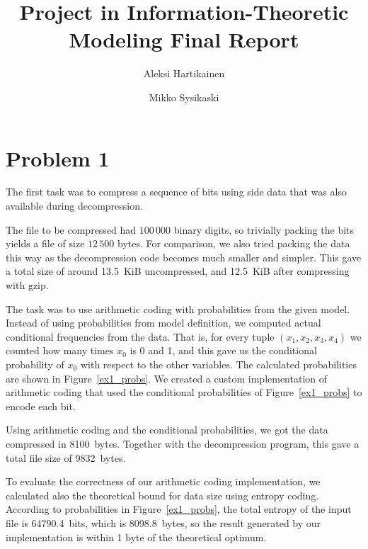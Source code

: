 \documentclass{article}
\title{Project in Information-Theoretic Modeling Final Report}
\author{Aleksi Hartikainen \and Mikko Sysikaski}
\begin{document}
\maketitle



\section{Problem 1}

The first task was to compress a sequence of bits using side data that was also available during decompression.

The file to be compressed had $100\,000$ binary digits, so trivially packing the bits yields a file of size $12\,500$ bytes.
For comparison, we also tried packing the data this way as the decompression code becomes much smaller and simpler.
This gave a total size of around 13.5~KiB uncompressed, and 12.5~KiB after compressing with gzip.

The task was to use arithmetic coding with probabilities from the given model.
Instead of using probabilities from model definition, we computed actual conditional frequencies from the data.
That is, for every tuple $(x_1,x_2,x_3,x_4)$ we counted how many times $x_0$ is 0 and 1, and this gave us the conditional probability of $x_0$ with respect to the other variables.
The calculated probabilities are shown in Figure~\ref{ex1_probs}.
We created a custom implementation of arithmetic coding that used the conditional probabilities of Figure~\ref{ex1_probs} to encode each bit.

Using arithmetic coding and the conditional probabilities, we got the data compressed in 8100~bytes.
Together with the decompression program, this gave a total file size of 9832~bytes.

To evaluate the correctness of our arithmetic coding implementation, we calculated also the theoretical bound for data size using entropy coding.
According to probabilities in Figure~\ref{ex1_probs}, the total entropy of the input file is 64790.4~bits, which is 8098.8~bytes, so the result generated by our implementation is within 1 byte of the theoretical optimum.
\end{document}

